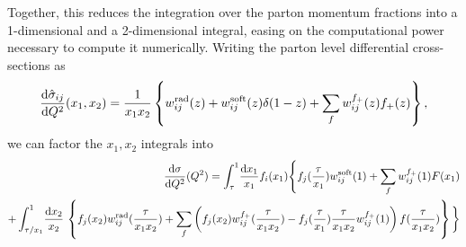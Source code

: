 \documentclass[../main.tex]{subfiles}
\begin{document}
Together, this reduces the integration over the parton momentum fractions into a 1-dimensional and a 2-dimensional integral, easing on the computational power necessary to compute it numerically.
Writing the parton level differential cross-sections as
\begin{equation}
  \d[Q^2]{\hat\sigma_{ij}}(x_1, x_2) = \frac{1}{x_1 x_2} \cclosed{w_{ij}^\text{rad}(z) + w_{ij}^\text{soft}(z) \delta(1-z) + \sum_{f} w_{ij}^{f_+}(z) f_+(z)},
\end{equation}
we can factor the \(x_1, x_2\) integrals into
\begin{align}
  \nonumber
  \d[Q^2]{\sigma}(Q^2) = \int_{\tau}^1 \! \frac{\mathrm{d}x_1}{x_1} f_i(x_1) \Bigg\{ f_j(\frac{\tau}{x_1})w^\text{soft}_{ij}(1) + \sum_f w^{f_+}_{ij}(1) F(x_1) \\
  + \int_{\tau/x_1}^1\!\frac{\mathrm{d}x_2}{x_2}\, \cclosed{f_j(x_2) w^\text{rad}_{ij}(\frac{\tau}{x_1 x_2}) +  \sum_f \pclosed{f_j(x_2) w^{f_+}_{ij}(\frac{\tau}{x_1 x_2}) - f_j(\frac{\tau}{x_1}) \frac{\tau}{x_1 x_2} w^{f_+}_{ij}(1)} f(\frac{\tau}{x_1 x_2})} \bigg\}
\end{align}

\ifSubfilesClassLoaded{%
  {}
  
}{}
\end{document}
